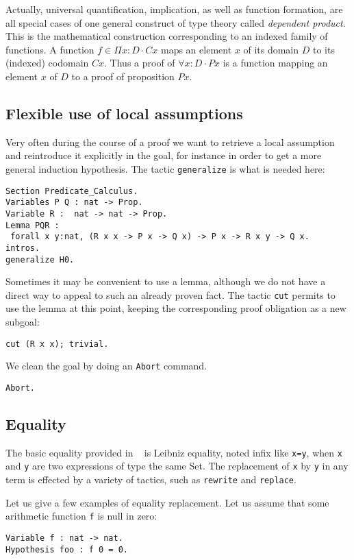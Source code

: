 \documentclass{book}
\begin{document}
Actually, universal quantification, implication, 
as well as function formation, are
all special cases of one general construct of type theory called
{\sl dependent product}. This is the mathematical construction 
corresponding to an indexed family of functions. A function 
$f\in \Pi x:D\cdot Cx$ maps an element $x$ of its domain $D$ to its
(indexed) codomain $Cx$. Thus a proof of $\forall x:D\cdot Px$ is
a function mapping an element $x$ of $D$ to a proof of proposition $Px$.


\subsection{Flexible use of local assumptions}

Very often during the course of a proof we want to retrieve a local
assumption and reintroduce it explicitly in the goal, for instance
in order to get a more general induction hypothesis. The tactic
\verb:generalize: is what is needed here:

\begin{lstlisting}
Section Predicate_Calculus.
Variables P Q : nat -> Prop.
Variable R :  nat -> nat -> Prop.
Lemma PQR :
 forall x y:nat, (R x x -> P x -> Q x) -> P x -> R x y -> Q x.
intros.
generalize H0.
\end{lstlisting}

Sometimes it may be convenient to use a lemma, although we do not have
a direct way to appeal to such an already proven fact. The tactic \verb:cut:
permits to use the lemma at this point, keeping the corresponding proof
obligation as a new subgoal:
\begin{lstlisting}
cut (R x x); trivial.
\end{lstlisting}
We clean the goal by doing an \verb:Abort: command.
\begin{lstlisting}
Abort.
\end{lstlisting}


\subsection{Equality}

The basic equality provided in \Coq~ is Leibniz equality, noted infix like
\verb+x=y+, when \verb:x: and \verb:y: are two expressions of
type the same Set. The replacement of \verb:x: by \verb:y: in any
term is effected by a variety of tactics, such as \verb:rewrite:
and \verb:replace:. 

Let us give a few examples of equality replacement. Let us assume that
some arithmetic function \verb:f: is null in zero:
\begin{lstlisting}
Variable f : nat -> nat.
Hypothesis foo : f 0 = 0.
\end{lstlisting}
\end{document}
